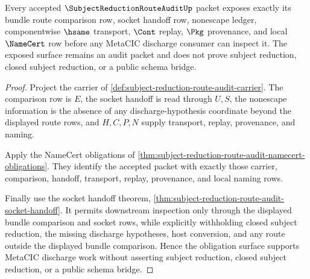 \begin{theorem}
\label{thm:subject-reduction-route-audit-obligation-surface}
Every accepted $\SubjectReductionRouteAuditUp$ packet exposes exactly its bundle route comparison row, socket handoff row, nonescape ledger, componentwise $\hsame$ transport, $\Cont$ replay, $\Pkg$ provenance, and local $\NameCert$ row before any MetaCIC discharge consumer can inspect it. The exposed surface remains an audit packet and does not prove subject reduction, closed subject reduction, or a public schema bridge.
\end{theorem}
\begin{proof}
Project the carrier of \autoref{def:subject-reduction-route-audit-carrier}. The comparison row is $E$, the socket handoff is read through $U,S$, the nonescape information is the absence of any discharge-hypothesis coordinate beyond the displayed route rows, and $H,C,P,N$ supply transport, replay, provenance, and naming.

Apply the NameCert obligations of \autoref{thm:subject-reduction-route-audit-namecert-obligations}. They identify the accepted packet with exactly those carrier, comparison, handoff, transport, replay, provenance, and local naming rows.

Finally use the socket handoff theorem, \autoref{thm:subject-reduction-route-audit-socket-handoff}. It permits downstream inspection only through the displayed bundle comparison and socket rows, while explicitly withholding closed subject reduction, the missing discharge hypotheses, host conversion, and any route outside the displayed bundle comparison. Hence the obligation surface supports MetaCIC discharge work without asserting subject reduction, closed subject reduction, or a public schema bridge.
\end{proof}

